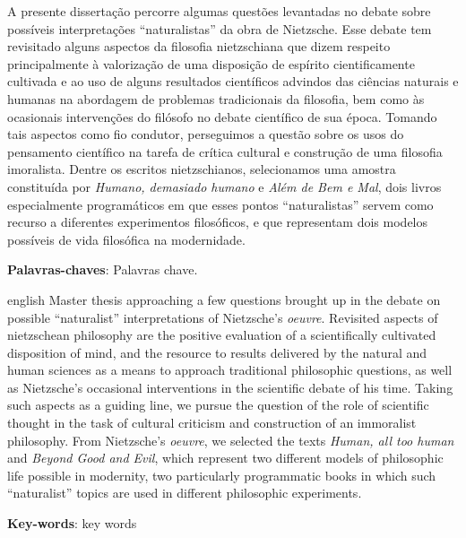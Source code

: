 \documentclass[
	12pt,				%
	openright,			%
	oneside,			%
	a4paper,			%
	english,			%
	french,				%
	spanish,			%
	brazil				%
	]{abntex2}
\begin{document}
\setlength{\absparsep}{18pt} %
\begin{resumo}
A presente dissertação percorre algumas questões levantadas no debate sobre possíveis interpretações “naturalistas” da obra de Nietzsche. Esse debate tem revisitado alguns aspectos da filosofia nietzschiana que dizem respeito principalmente à valorização de uma disposição de espírito cientificamente cultivada e ao uso de alguns resultados científicos advindos das ciências naturais e humanas na abordagem de problemas tradicionais da filosofia, bem como às ocasionais intervenções do filósofo no debate científico de sua época. Tomando tais aspectos como fio condutor, perseguimos a questão sobre os usos do pensamento científico na tarefa de crítica cultural e construção de uma filosofia imoralista. Dentre os escritos nietzschianos, selecionamos uma amostra constituída por \textit{Humano, demasiado humano} e \textit{Além de Bem e Mal}, dois livros especialmente programáticos em que esses pontos “naturalistas” servem como recurso a diferentes experimentos filosóficos, e que representam dois modelos possíveis de vida filosófica na modernidade.

 \textbf{Palavras-chaves}: Palavras chave.
\end{resumo}

\begin{resumo}[Abstract]
 \begin{otherlanguage*}{english}
Master thesis approaching a few questions brought up in the debate on possible “naturalist” interpretations of Nietzsche's \textit{oeuvre}. Revisited aspects of nietzschean philosophy are the positive evaluation of a scientifically cultivated disposition of mind, and the resource to results delivered by the natural and human sciences as a means to approach traditional philosophic questions, as well as Nietzsche's occasional interventions in the scientific debate of his time. Taking such aspects as a guiding line, we pursue the question of the role of scientific thought in the task of cultural criticism and construction of an immoralist philosophy. From Nietzsche's \textit{oeuvre}, we selected the texts \textit{Human, all too human} and \textit{Beyond Good and Evil}, which represent two different models of philosophic life possible in modernity, two particularly programmatic books in which such “naturalist” topics are used in different philosophic experiments.

   \vspace{\onelineskip}
 
   \noindent 
   \textbf{Key-words}: key words
 \end{otherlanguage*}
\end{resumo}
\end{document}
